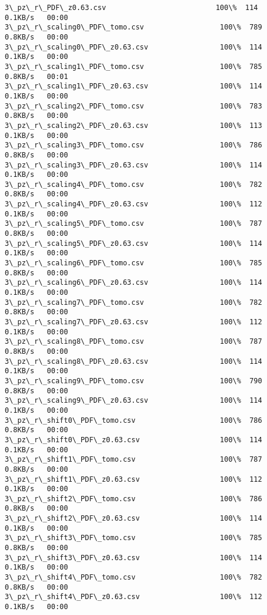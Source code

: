 \documentclass[11pt]{article}
\begin{document}
\begin{Verbatim}[commandchars=\\\{\}]
3\_pz\_r\_PDF\_z0.63.csv                          100\%  114     0.1KB/s   00:00    
3\_pz\_r\_scaling0\_PDF\_tomo.csv                  100\%  789     0.8KB/s   00:00    
3\_pz\_r\_scaling0\_PDF\_z0.63.csv                 100\%  114     0.1KB/s   00:00    
3\_pz\_r\_scaling1\_PDF\_tomo.csv                  100\%  785     0.8KB/s   00:01    
3\_pz\_r\_scaling1\_PDF\_z0.63.csv                 100\%  114     0.1KB/s   00:00    
3\_pz\_r\_scaling2\_PDF\_tomo.csv                  100\%  783     0.8KB/s   00:00    
3\_pz\_r\_scaling2\_PDF\_z0.63.csv                 100\%  113     0.1KB/s   00:00    
3\_pz\_r\_scaling3\_PDF\_tomo.csv                  100\%  786     0.8KB/s   00:00    
3\_pz\_r\_scaling3\_PDF\_z0.63.csv                 100\%  114     0.1KB/s   00:00    
3\_pz\_r\_scaling4\_PDF\_tomo.csv                  100\%  782     0.8KB/s   00:00    
3\_pz\_r\_scaling4\_PDF\_z0.63.csv                 100\%  112     0.1KB/s   00:00    
3\_pz\_r\_scaling5\_PDF\_tomo.csv                  100\%  787     0.8KB/s   00:00    
3\_pz\_r\_scaling5\_PDF\_z0.63.csv                 100\%  114     0.1KB/s   00:00    
3\_pz\_r\_scaling6\_PDF\_tomo.csv                  100\%  785     0.8KB/s   00:00    
3\_pz\_r\_scaling6\_PDF\_z0.63.csv                 100\%  114     0.1KB/s   00:00    
3\_pz\_r\_scaling7\_PDF\_tomo.csv                  100\%  782     0.8KB/s   00:00    
3\_pz\_r\_scaling7\_PDF\_z0.63.csv                 100\%  112     0.1KB/s   00:00    
3\_pz\_r\_scaling8\_PDF\_tomo.csv                  100\%  787     0.8KB/s   00:00    
3\_pz\_r\_scaling8\_PDF\_z0.63.csv                 100\%  114     0.1KB/s   00:00    
3\_pz\_r\_scaling9\_PDF\_tomo.csv                  100\%  790     0.8KB/s   00:00    
3\_pz\_r\_scaling9\_PDF\_z0.63.csv                 100\%  114     0.1KB/s   00:00    
3\_pz\_r\_shift0\_PDF\_tomo.csv                    100\%  786     0.8KB/s   00:00    
3\_pz\_r\_shift0\_PDF\_z0.63.csv                   100\%  114     0.1KB/s   00:00    
3\_pz\_r\_shift1\_PDF\_tomo.csv                    100\%  787     0.8KB/s   00:00    
3\_pz\_r\_shift1\_PDF\_z0.63.csv                   100\%  112     0.1KB/s   00:00    
3\_pz\_r\_shift2\_PDF\_tomo.csv                    100\%  786     0.8KB/s   00:00    
3\_pz\_r\_shift2\_PDF\_z0.63.csv                   100\%  114     0.1KB/s   00:00    
3\_pz\_r\_shift3\_PDF\_tomo.csv                    100\%  785     0.8KB/s   00:00    
3\_pz\_r\_shift3\_PDF\_z0.63.csv                   100\%  114     0.1KB/s   00:00    
3\_pz\_r\_shift4\_PDF\_tomo.csv                    100\%  782     0.8KB/s   00:00    
3\_pz\_r\_shift4\_PDF\_z0.63.csv                   100\%  112     0.1KB/s   00:00    

\end{Verbatim}
\end{document}

